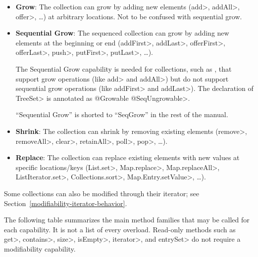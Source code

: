 \begin{itemize}
    \item \textbf{Grow}: The collection can grow by adding new elements
      (\<add>, \<addAll>, \<offer>, \ldots) at arbitrary locations.
       Not to be confused with sequential grow.
    \item \textbf{Sequential Grow}: The sequenced collection can grow by adding new
      elements at the beginning or end (\<addFirst>, \<addLast>,
      \<offerFirst>, \<offerLast>, \<push>, \<putFirst>,
      \<putLast>, \ldots).

      The Sequential Grow capability is needed for collections, such as
      , that
      support grow operations (like \<add> and \<addAll>) but do not
      support sequential grow operations (like \<addFirst> and
      \<addLast>).  The declaration of \<TreeSet> is annotated as \<@Growable @SeqUngrowable>.

      ``Sequential Grow'' is shorted to ``SeqGrow'' in the rest of the manual.
    \item \textbf{Shrink}: The collection can shrink by removing
      existing elements (\<remove>, \<removeAll>, \<clear>, \<retainAll>, \<poll>, \<pop>, \ldots).
    \item \textbf{Replace}: The collection can replace existing
      elements with new values at specific locations/keys (\<List.set>, \<Map.replace>, \<Map.replaceAll>,
       \<ListIterator.set>,  \<Collections.sort>, \<Map.Entry.setValue>, \ldots).
\end{itemize}

\noindent
Some collections can also be modified through their iterator; see Section~\ref{modifiability-iterator-behavior}.

The following table summarizes the main method families that may be called
for each capability.  It is not a list of every overload.  Read-only
methods such as \<get>, \<contains>, \<size>, \<isEmpty>, \<iterator>, and
\<entrySet> do not require a modifiability capability.

